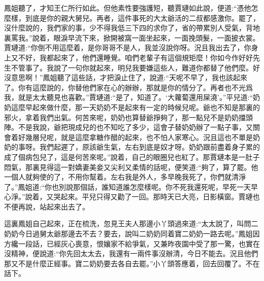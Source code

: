 \begin{parag}
    鳳姐聽了，才知王仁所行如此。但他素性要強護短，聽賈璉如此說，便道:“憑他怎麼樣，到底是你的親大舅兒。再者，這件事死的大太爺活的二叔都感激你。罷了，沒什麼說的，我們家的事，少不得我低三下四的求你了，省的帶累別人受氣，背地裏罵我。”說着，眼淚早流下來，掀開被窩一面坐起來，一面挽頭髮，一面披衣裳。賈璉道:“你倒不用這麼着，是你哥哥不是人，我並沒說你呀。況且我出去了，你身上又不好，我都起來了，他們還睡覺。咱們老輩子有這個規矩麼！你如今作好好先生不管事了。我說了一句你就起來，明兒我要嫌這些人，難道你都替了他們麼。好沒意思啊！”鳳姐聽了這些話，才把淚止住了，說道:“天呢不早了，我也該起來了。你有這麼說的，你替他們家在心的辦辦，那就是你的情分了。再者也不光爲我，就是太太聽見也喜歡。”賈璉道:“是了，知道了。‘大蘿蔔還用屎澆’。”平兒道:“奶奶這麼早起來做什麼，那一天奶奶不是起來有一定的時候兒呢。爺也不知是那裏的邪火，拿着我們出氣。何苦來呢，奶奶也算替爺掙夠了，那一點兒不是奶奶擋頭陣。不是我說，爺把現成兒的也不知吃了多少，這會子替奶奶辦了一點子事，又關會着好幾層兒呢，就是這麼拿糖作醋的起來，也不怕人家寒心。況且這也不單是奶奶的事呀。我們起遲了，原該爺生氣，左右到底是奴才呀。奶奶跟前盡着身子累的成了個病包兒了，這是何苦來呢。”說着，自己的眼圈兒也紅了。那賈璉本是一肚子悶氣，那裏見得這一對嬌妻美妾又尖利又柔情的話呢，便笑道:“夠了，算了罷。他一個人就夠使的了，不用你幫着。左右我是外人，多早晚我死了，你們就清淨了。”鳳姐道:“你也別說那個話，誰知道誰怎麼樣呢。你不死我還死呢，早死一天早心淨。”說着，又哭起來。平兒只得又勸了一回。那時天已大亮，日影橫窗。賈璉也不便再說，站起來出去了。
\end{parag}


\begin{parag}
    這裏鳳姐自己起來，正在梳洗，忽見王夫人那邊小丫頭過來道:“太太說了，叫問二奶奶今日過舅太爺那邊去不去？要去，說叫二奶奶同着寶二奶奶一路去呢。”鳳姐因方纔一段話，已經灰心喪意，恨孃家不給爭氣，又兼昨夜園中受了那一驚，也實在沒精神，便說道:“你先回太太去，我還有一兩件事沒辦清，今日不能去。況且他們那又不是什麼正經事。寶二奶奶要去各自去罷。”小丫頭答應着，回去回覆了。不在話下。
\end{parag}


